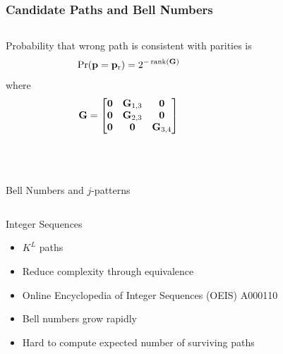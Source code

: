 
\begin{frame}
\frametitle{Candidate Paths and Bell Numbers}
\begin{columns}
  
  Probability that wrong path is consistent with parities is
  \begin{equation*}
  \Pr (\mathbf{p} = \mathbf{p}_{\mathrm{r}}) = {2^{-\operatorname{rank}(\mathbf{G})}}
  \end{equation*}
  where
  \begin{equation*}
  \mathbf{G} = \begin{bmatrix}
  \mathbf{0} & \mathbf{G}_{1,3} & \mathbf{0} \\
  \mathbf{0} & \mathbf{G}_{2,3} & \mathbf{0} \\
  \mathbf{0} & \mathbf{0}& \mathbf{G}_{3,4}
  \end{bmatrix}
  \end{equation*}
\end{columns}
\vfill
\begin{center}
 \\[2mm]
\end{center}
\end{frame}


\begin{frame}{Bell Numbers and $j$-patterns}
\begin{columns}
  \begin{block}{Integer Sequences}
  \begin{itemize}
  \item $K^L$ paths
  \item Reduce complexity through equivalence
  \item Online Encyclopedia of Integer Sequences (OEIS) A000110
  \item Bell numbers grow rapidly
  \item Hard to compute expected number of surviving paths
  \end{itemize}
  \end{block}
  \scalebox{0.75}{}
\end{columns}
\vfill
\begin{center}
\end{center}
\end{frame}

